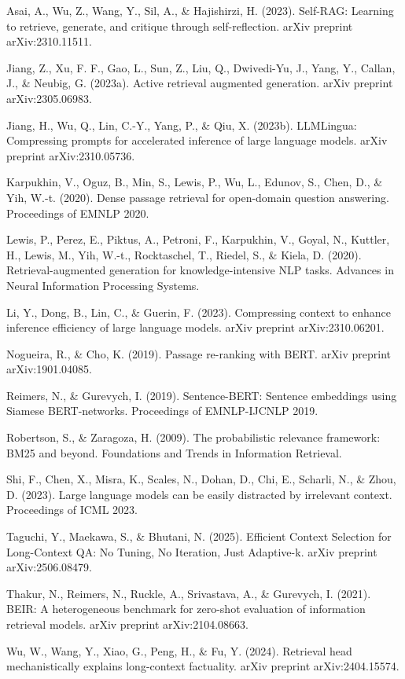 \documentclass[11pt]{article}
\begin{document}
Asai, A., Wu, Z., Wang, Y., Sil, A., \& Hajishirzi, H. (2023). Self-RAG: Learning to retrieve, generate, and critique through self-reflection. arXiv preprint arXiv:2310.11511.

Jiang, Z., Xu, F. F., Gao, L., Sun, Z., Liu, Q., Dwivedi-Yu, J., Yang, Y., Callan, J., \& Neubig, G. (2023a). Active retrieval augmented generation. arXiv preprint arXiv:2305.06983.

Jiang, H., Wu, Q., Lin, C.-Y., Yang, P., \& Qiu, X. (2023b). LLMLingua: Compressing prompts for accelerated inference of large language models. arXiv preprint arXiv:2310.05736.

Karpukhin, V., Oguz, B., Min, S., Lewis, P., Wu, L., Edunov, S., Chen, D., \& Yih, W.-t. (2020). Dense passage retrieval for open-domain question answering. Proceedings of EMNLP 2020.

Lewis, P., Perez, E., Piktus, A., Petroni, F., Karpukhin, V., Goyal, N., Kuttler, H., Lewis, M., Yih, W.-t., Rocktaschel, T., Riedel, S., \& Kiela, D. (2020). Retrieval-augmented generation for knowledge-intensive NLP tasks. Advances in Neural Information Processing Systems.

Li, Y., Dong, B., Lin, C., \& Guerin, F. (2023). Compressing context to enhance inference efficiency of large language models. arXiv preprint arXiv:2310.06201.

Nogueira, R., \& Cho, K. (2019). Passage re-ranking with BERT. arXiv preprint arXiv:1901.04085.

Reimers, N., \& Gurevych, I. (2019). Sentence-BERT: Sentence embeddings using Siamese BERT-networks. Proceedings of EMNLP-IJCNLP 2019.

Robertson, S., \& Zaragoza, H. (2009). The probabilistic relevance framework: BM25 and beyond. Foundations and Trends in Information Retrieval.

Shi, F., Chen, X., Misra, K., Scales, N., Dohan, D., Chi, E., Scharli, N., \& Zhou, D. (2023). Large language models can be easily distracted by irrelevant context. Proceedings of ICML 2023.

Taguchi, Y., Maekawa, S., \& Bhutani, N. (2025). Efficient Context Selection for Long-Context QA: No Tuning, No Iteration, Just Adaptive-k. arXiv preprint arXiv:2506.08479.

Thakur, N., Reimers, N., Ruckle, A., Srivastava, A., \& Gurevych, I. (2021). BEIR: A heterogeneous benchmark for zero-shot evaluation of information retrieval models. arXiv preprint arXiv:2104.08663.

Wu, W., Wang, Y., Xiao, G., Peng, H., \& Fu, Y. (2024). Retrieval head mechanistically explains long-context factuality. arXiv preprint arXiv:2404.15574.
\end{document}
